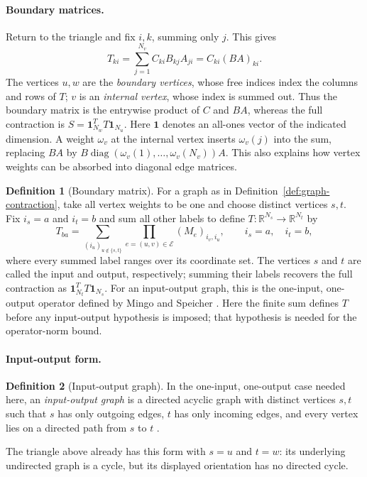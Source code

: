 \documentclass[11pt]{article}
\theoremstyle{definition}
\newtheorem{definition}{Definition}[section]
\theoremstyle{remark}
\theoremstyle{plain}
\newcommand{\R}{\mathbb R}
\newcommand{\one}{\mathbf 1}
\DeclareMathOperator{\diag}{diag}
\begin{document}
\paragraph{Boundary matrices.}
Return to the triangle and fix $i,k$, summing only $j$. This gives
\[
 T_{ki}=\sum_{j=1}^{N_v}C_{ki}B_{kj}A_{ji}
       =C_{ki}(BA)_{ki}.
\]
The vertices $u,w$ are the \emph{boundary vertices}, whose free
indices index the columns and rows of $T$; $v$ is an \emph{internal
vertex}, whose index is summed out. Thus the boundary matrix is
the entrywise product of $C$ and $BA$, whereas the full contraction
is $S=\one_{N_w}^TT\one_{N_u}$. Here $\one$ denotes an all-ones
vector of the indicated dimension. A weight $\omega_v$ at the
internal vertex inserts $\omega_v(j)$ into the sum, replacing $BA$
by $B\diag(\omega_v(1),\ldots,\omega_v(N_v))A$. This also explains
how vertex weights can be absorbed into diagonal edge matrices.

\begin{definition}[Boundary matrix]\label{def:boundary-matrix}
For a graph as in Definition~\ref{def:graph-contraction},
take all vertex weights to be one and choose
distinct vertices $s,t$. Fix $i_s=a$ and $i_t=b$ and sum all other
labels to define $T:\R^{N_s}\to\R^{N_t}$ by
\[
 T_{ba}=
 \sum_{(i_u)_{u\notin\{s,t\}}}
       \prod_{e=(u,v)\in\mathcal E}(M_e)_{i_v,i_u},
 \qquad i_s=a,\quad i_t=b,
\]
where every summed label ranges over its coordinate set. The vertices
$s$ and $t$ are called the input and output, respectively; summing their labels recovers
the full contraction as $\one_{N_t}^TT\one_{N_s}$.
For an input-output graph, this is the one-input, one-output
operator defined by Mingo and Speicher \cite[Eq.~(11), p.~2281]{mingo}.
Here the finite sum defines $T$ before any input-output hypothesis
is imposed; that hypothesis is needed for the operator-norm bound.
\end{definition}

\paragraph{Input-output form.}
\begin{definition}[Input-output graph]\label{def:input-output}
In the one-input, one-output case needed here, an \emph{input-output
graph} is a directed acyclic graph with distinct vertices $s,t$
such that $s$ has only outgoing edges, $t$ has only incoming edges,
and every vertex lies on a directed path from $s$ to $t$
\cite[Definition~10, p.~2280]{mingo}.
\end{definition}
The triangle above already has this
form with $s=u$ and $t=w$: its underlying undirected graph is a
cycle, but its displayed orientation has no directed cycle.
\end{document}
